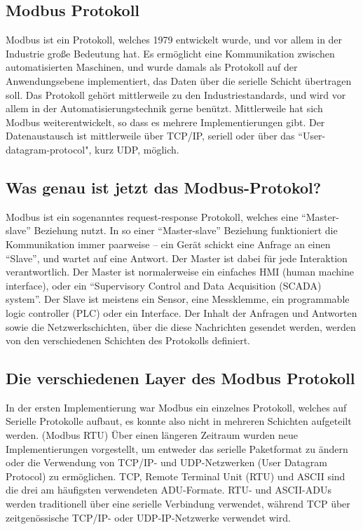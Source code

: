 \subsection{Modbus Protokoll}\label{modbusprotokoll}

Modbus ist ein Protokoll, welches 1979 entwickelt wurde, und vor allem in der Industrie große Bedeutung hat. Es ermöglicht eine Kommunikation zwischen automatisierten Maschinen, und wurde damals als Protokoll auf der Anwendungsebene implementiert, das Daten über die serielle Schicht übertragen soll. Das Protokoll gehört mittlerweile zu den Industriestandards, und wird vor allem in der Automatisierungstechnik gerne benützt. Mittlerweile hat sich Modbus weiterentwickelt, so dass es mehrere Implementierungen gibt. Der Datenaustausch ist mittlerweile über TCP/IP, seriell oder über das “User-datagram-protocol", kurz UDP, möglich.
\cite{ModbusgrundlagenKubunu} \cite{modbuskubunu}

\subsection{Was genau ist jetzt das Modbus-Protokol?}
Modbus ist ein sogenanntes request-response Protokoll, welches eine “Master-slave” Beziehung nutzt. In so einer “Master-slave” Beziehung funktioniert die Kommunikation immer paarweise – ein Gerät schickt eine Anfrage an einen “Slave”, und wartet auf eine Antwort. Der Master ist dabei für jede Interaktion verantwortlich. Der Master ist normalerweise ein einfaches HMI (human machine interface), oder ein “Supervisory Control and Data Acquisition (SCADA) system”.  Der Slave ist meistens ein Sensor, eine Messklemme, ein programmable logic controller (PLC) oder ein Interface. Der Inhalt der Anfragen und Antworten sowie die Netzwerkschichten, über die diese Nachrichten gesendet werden, werden von den verschiedenen Schichten des Protokolls definiert. 
\cite{modbusoverserial}
\subsection{Die verschiedenen Layer des Modbus Protokoll }
In der ersten Implementierung war Modbus ein einzelnes Protokoll, welches auf Serielle Protokolle aufbaut, es konnte also nicht in mehreren Schichten aufgeteilt werden. (Modbus RTU) 
Über einen längeren Zeitraum wurden neue Implementierungen vorgestellt, um entweder das serielle Paketformat zu ändern oder die Verwendung von TCP/IP- und UDP-Netzwerken (User Datagram Protocol) zu ermöglichen. TCP, Remote Terminal Unit (RTU) und ASCII sind die drei am häufigsten verwendeten ADU-Formate. RTU- und ASCII-ADUs werden traditionell über eine serielle Verbindung verwendet, während TCP über zeitgenössische TCP/IP- oder UDP-IP-Netzwerke verwendet wird. 

